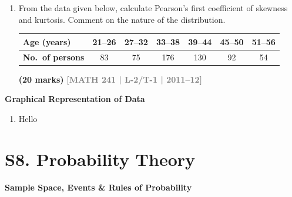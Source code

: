 \documentclass[12pt,a4paper]{article}
\newcommand{\yr}[1]{\hfill\textcolor{gray}{\small\textbf{[#1]}}}
\newcommand{\mk}[1]{\textcolor{orange!70!black}{\small\textbf{(#1 marks)}}}
\newcommand{\subtopic}[2]{%
  \vspace{10pt}
  \noindent\begin{tcolorbox}[colback=#1!8,colframe=#1,boxrule=0.6pt,arc=4pt,
    left=6pt,right=6pt,top=4pt,bottom=4pt]
    \small\bfseries\textcolor{#1}{#2}
  \end{tcolorbox}
  \vspace{2pt}
}
\begin{document}
\begin{enumerate}
\item From the data given below, calculate Pearson's first coefficient of skewness and kurtosis. Comment on the nature of the distribution.
\begin{center}
\begin{tabular}{lcccccc}
\toprule
\textbf{Age (years)} & 21--26 & 27--32 & 33--38 & 39--44 & 45--50 & 51--56 \\
\midrule
\textbf{No.\ of persons} & 83 & 75 & 176 & 130 & 92 & 54 \\
\bottomrule
\end{tabular}
\end{center}
\mk{20} \yr{MATH 241 | L-2/T-1 | 2011--12}

\end{enumerate}

\subtopic{cG}{Graphical Representation of Data}
\label{sub:s7-graphs}

\begin{enumerate}\item Hello \end{enumerate}


\section{S8. Probability Theory}
\label{sec:S8}

\subtopic{cG}{Sample Space, Events \& Rules of Probability}
\label{sub:s8-basic}
\end{document}

